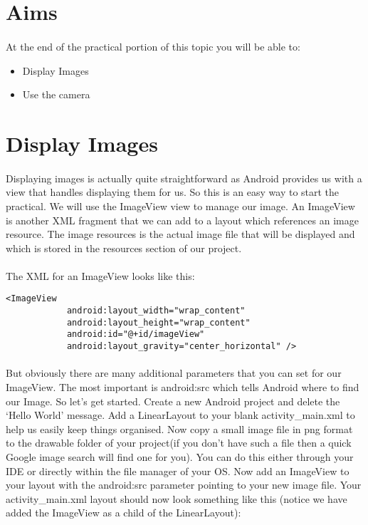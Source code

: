 \section{Aims}
\paragraph{} At the end of the practical portion of this topic you will be able to:

\begin{itemize}
\item Display Images
\item Use the camera
\end{itemize}

\section{Display Images}
\paragraph{} Displaying images is actually quite straightforward as Android provides us with a view that handles displaying them for us. So this is an easy way to start the practical. We will use the ImageView view to manage our image. An ImageView is another XML fragment that we can add to a layout which references an image resource. The image resources is the actual image file that will be displayed and which is stored in the resources section of our project.

\paragraph{} The XML for an ImageView looks like this:

\begin{lstlisting}
<ImageView
            android:layout_width="wrap_content"
            android:layout_height="wrap_content"
            android:id="@+id/imageView"
            android:layout_gravity="center_horizontal" />
\end{lstlisting}

\paragraph{} But obviously there are many additional parameters that you can set for our ImageView. The most important is android:src which tells Android where to find our Image. So let's get started. Create a new Android project and delete the `Hello World' message. Add a LinearLayout to your blank activity\_main.xml to help us easily keep things organised. Now copy a small image file in png format to the drawable folder of your project(if you don't have such a file then a quick Google image search will find one for you). You can do this either through your IDE or directly within the file manager of your OS. Now add an ImageView to your layout with the android:src parameter pointing to your new image file. Your activity\_main.xml layout should now look something like this (notice we have added the ImageView as a child of the LinearLayout):

